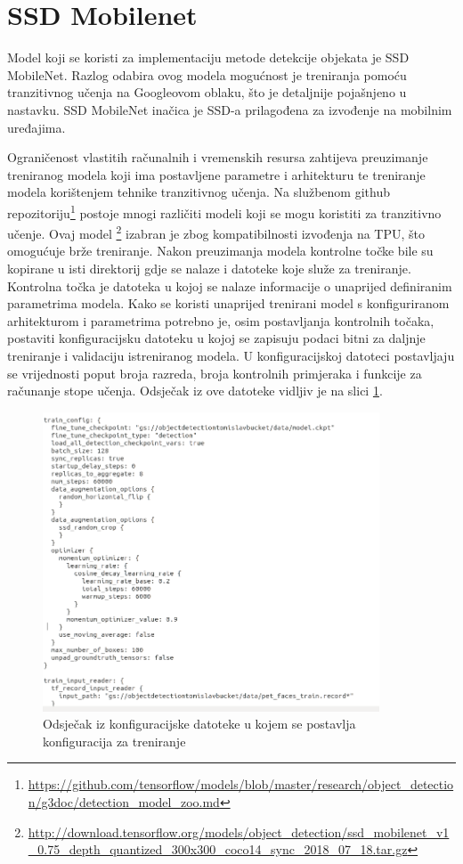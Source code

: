\section{SSD Mobilenet}
Model koji se koristi za implementaciju metode detekcije objekata je SSD MobileNet.
Razlog odabira ovog modela mogućnost je treniranja pomoću tranzitivnog učenja na Googleovom oblaku, što je detaljnije pojašnjeno u nastavku.
SSD MobileNet inačica je SSD-a prilagođena za izvođenje na mobilnim uređajima.

Ograničenost vlastitih računalnih i vremenskih resursa zahtijeva preuzimanje treniranog modela koji ima postavljene parametre i arhitekturu te treniranje modela korištenjem tehnike tranzitivnog učenja.
Na službenom github repozitoriju\footnote{\url{https://github.com/tensorflow/models/blob/master/research/object_detection/g3doc/detection_model_zoo.md}}
postoje mnogi različiti modeli koji se mogu koristiti za tranzitivno učenje. Ovaj model \footnote{\url{http://download.tensorflow.org/models/object_detection/ssd_mobilenet_v1_0.75_depth_quantized_300x300_coco14_sync_2018_07_18.tar.gz}}
izabran je zbog kompatibilnosti izvođenja na TPU, što omogućuje brže treniranje. Nakon preuzimanja modela kontrolne točke bile su kopirane u isti direktorij gdje se nalaze i datoteke koje služe za treniranje.
Kontrolna točka je datoteka u kojoj se nalaze informacije o unaprijed definiranim parametrima modela. 
Kako se koristi unaprijed trenirani model s konfiguriranom arhitekturom i parametrima potrebno je, osim postavljanja kontrolnih točaka, postaviti konfiguracijsku datoteku u kojoj se zapisuju podaci bitni za daljnje treniranje i
validaciju istreniranog modela. U konfiguracijskoj datoteci postavljaju se vrijednosti poput broja razreda, broja kontrolnih primjeraka i funkcije za računanje stope učenja. 
Odsječak iz ove datoteke vidljiv je na slici \ref{Pipeline}.

\begin{figure}[htb]
    \centering
    \includegraphics[width=10cm]{img/pipeline.png}
    \caption{Odsječak iz konfiguracijske datoteke u kojem se postavlja konfiguracija za treniranje}
    \label{Pipeline}
\end{figure}


